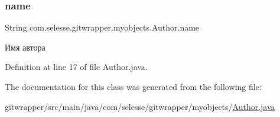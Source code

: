 \subsubsection{\texorpdfstring{name}{name}}
{\footnotesize\ttfamily String com.\+selesse.\+gitwrapper.\+myobjects.\+Author.\+name\hspace{0.3cm}{\ttfamily [private]}}



Имя автора 



Definition at line 17 of file Author.\+java.



The documentation for this class was generated from the following file\+:\begin{DoxyCompactItemize}
\item 
gitwrapper/src/main/java/com/selesse/gitwrapper/myobjects/\hyperlink{_author_8java}{Author.\+java}\end{DoxyCompactItemize}
